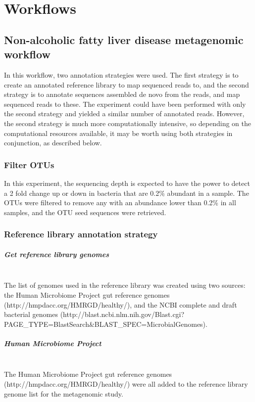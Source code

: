 \chapter{Workflows}\label{AppA}
\section{Non-alcoholic fatty liver disease metagenomic workflow}

In this workflow, two annotation strategies were used. The first strategy is to create an annotated reference library to map sequenced reads to, and the second strategy is to annotate sequences assembled de novo from the reads, and map sequenced reads to these. The experiment could have been performed with only the second strategy and yielded a similar number of annotated reads. However, the second strategy is much more computationally intensive, so depending on the computational resources available, it may be worth using both strategies in conjunction, as described below.

\subsection{Filter OTUs}
In this experiment, the sequencing depth is expected to have the power to detect a 2 fold change up or down in bacteria that are 0.2\% abundant in a sample. The OTUs were filtered to remove any with an abundance lower than 0.2\% in all samples, and the OTU seed sequences were retrieved.

\subsection{Reference library annotation strategy}

\paragraph{Get reference library genomes}\mbox{}\\
The list of genomes used in the reference library was created using two sources: the Human Microbiome Project gut reference genomes (http://hmpdacc.org/HMRGD/healthy/), and the NCBI complete and draft bacterial genomes (http://blast.ncbi.nlm.nih.gov/Blast.cgi?PAGE_TYPE=BlastSearch&BLAST_SPEC=MicrobialGenomes).

\paragraph{Human Microbiome Project}\mbox{}\\
The Human Microbiome Project gut reference genomes (http://hmpdacc.org/HMRGD/healthy/) were all added to the reference library genome list for the metagenomic study.

